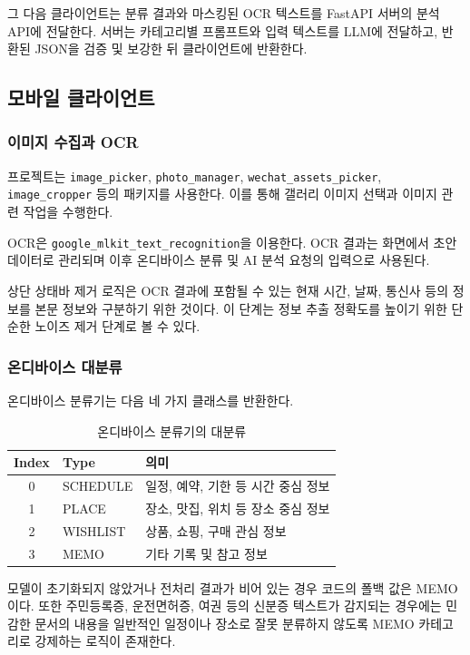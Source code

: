 \documentclass[11pt,a4paper]{article}
\begin{document}
그 다음 클라이언트는 분류 결과와 마스킹된 OCR 텍스트를 FastAPI 서버의 분석 API에 전달한다. 서버는 카테고리별 프롬프트와 입력 텍스트를 LLM에 전달하고, 반환된 JSON을 검증 및 보강한 뒤 클라이언트에 반환한다.

\subsection{모바일 클라이언트}

\subsubsection{이미지 수집과 OCR}

프로젝트는 \texttt{image\_picker}, \texttt{photo\_manager}, \texttt{wechat\_assets\_picker}, \texttt{image\_cropper} 등의 패키지를 사용한다. 이를 통해 갤러리 이미지 선택과 이미지 관련 작업을 수행한다.

OCR은 \texttt{google\_mlkit\_text\_recognition}을 이용한다. OCR 결과는 화면에서 초안 데이터로 관리되며 이후 온디바이스 분류 및 AI 분석 요청의 입력으로 사용된다.

상단 상태바 제거 로직은 OCR 결과에 포함될 수 있는 현재 시간, 날짜, 통신사 등의 정보를 본문 정보와 구분하기 위한 것이다. 이 단계는 정보 추출 정확도를 높이기 위한 단순한 노이즈 제거 단계로 볼 수 있다.

\subsubsection{온디바이스 대분류}

온디바이스 분류기는 다음 네 가지 클래스를 반환한다.

\begin{table}[H]
\centering
\begin{tabularx}{0.8\linewidth}{c l Y}
\toprule
\textbf{Index} & \textbf{Type} & \textbf{의미}\\
 & SCHEDULE & 일정, 예약, 기한 등 시간 중심 정보\\
1 & PLACE & 장소, 맛집, 위치 등 장소 중심 정보\\
2 & WISHLIST & 상품, 쇼핑, 구매 관심 정보\\
3 & MEMO & 기타 기록 및 참고 정보\\
\bottomrule
\end{tabularx}
\caption{온디바이스 분류기의 대분류}
\end{table}

모델이 초기화되지 않았거나 전처리 결과가 비어 있는 경우 코드의 폴백 값은 MEMO이다. 또한 주민등록증, 운전면허증, 여권 등의 신분증 텍스트가 감지되는 경우에는 민감한 문서의 내용을 일반적인 일정이나 장소로 잘못 분류하지 않도록 MEMO 카테고리로 강제하는 로직이 존재한다.
\end{document}
